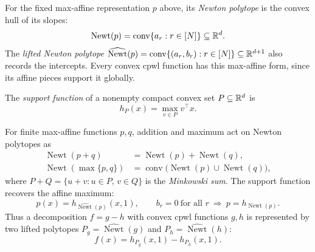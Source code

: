 \begin{definition}\label{def:newton_polytope}
For the fixed max-affine representation $p$ above, its \emph{Newton polytope} is the convex hull of its slopes:
\begin{equation}
    \operatorname{Newt}(p)=\operatorname{conv}\{a_r:r\in[N]\}\subseteq\mathbb{R}^d.
    \label{eq:newton_polytope}
\end{equation}
The \emph{lifted Newton polytope} $\widehat{\operatorname{Newt}}(p)=\operatorname{conv}\{(a_r,b_r):r\in[N]\}\subseteq\mathbb{R}^{d+1}$ also records the intercepts. Every convex \ac{cpwl} function has this max-affine form, since its affine pieces support it globally.
\end{definition}

\begin{definition}\label{def:support_function}
The \emph{support function} of a nonempty compact convex set $P\subseteq\mathbb{R}^d$ is
\begin{equation}
    h_P(x)=\max_{v\in P}v^\top x.
    \label{eq:support_function}
\end{equation}
\end{definition}

\begin{proposition}\label{prop:dc_polytope_representation}
For finite max-affine functions $p,q$, addition and maximum act on Newton polytopes as
\begin{equation}
\begin{aligned}
    \operatorname{Newt}(p+q)&=\operatorname{Newt}(p)+\operatorname{Newt}(q),\\
    \operatorname{Newt}(\max\{p,q\})&=\operatorname{conv}\bigl(\operatorname{Newt}(p)\cup\operatorname{Newt}(q)\bigr),
\end{aligned}
    \label{eq:newton_calculus}
\end{equation}
where $P+Q=\{u+v:u\in P,\,v\in Q\}$ is the \emph{Minkowski sum}. The support function recovers the affine maximum:
\begin{equation}
    p(x)=h_{\widehat{\operatorname{Newt}}(p)}(x,1),
    \qquad b_r=0\ \text{for all }r\ \Longrightarrow\ p=h_{\operatorname{Newt}(p)}.
    \label{eq:lifted_support}
\end{equation}
Thus a decomposition $f=g-h$ with convex \ac{cpwl} functions $g,h$ is represented by two lifted polytopes $P_g=\widehat{\operatorname{Newt}}(g)$ and $P_h=\widehat{\operatorname{Newt}}(h)$:
\begin{equation}
    f(x)=h_{P_g}(x,1)-h_{P_h}(x,1).
    \label{eq:dc_polytope_representation}
\end{equation}
\end{proposition}

